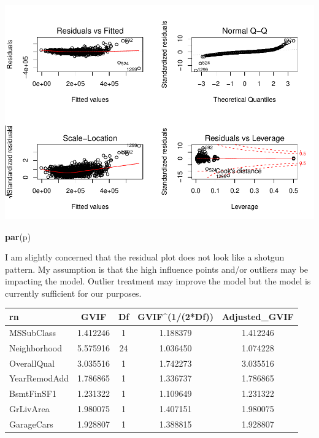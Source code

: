 \documentclass[]{article}
\newenvironment{Shaded}{\begin{snugshade}}{\end{snugshade}}
\newcommand{\KeywordTok}[1]{\textcolor[rgb]{0.13,0.29,0.53}{\textbf{{#1}}}}
\newcommand{\DataTypeTok}[1]{\textcolor[rgb]{0.13,0.29,0.53}{{#1}}}
\newcommand{\DecValTok}[1]{\textcolor[rgb]{0.00,0.00,0.81}{{#1}}}
\newcommand{\StringTok}[1]{\textcolor[rgb]{0.31,0.60,0.02}{{#1}}}
\newcommand{\OtherTok}[1]{\textcolor[rgb]{0.56,0.35,0.01}{{#1}}}
\newcommand{\NormalTok}[1]{{#1}}
\begin{document}
\includegraphics{Final_Project_files/figure-latex/unnamed-chunk-21-1.pdf}

\begin{Shaded}
\begin{Highlighting}[]
\KeywordTok{par}\NormalTok{(p)}
\end{Highlighting}
\end{Shaded}

I am slightly concerned that the residual plot does not look like a
shotgun pattern. My assumption is that the high influence points and/or
outliers may be impacting the model. Outlier treatment may improve the
model but the model is currently sufficient for our purposes.

\begin{Shaded}
\end{Shaded}

\begin{longtable}[]{@{}lcccc@{}}
\toprule
rn & GVIF & Df & GVIF\^{}(1/(2*Df)) & Adjusted\_GVIF\tabularnewline
\midrule
\endhead
MSSubClass & 1.412246 & 1 & 1.188379 & 1.412246\tabularnewline
Neighborhood & 5.575916 & 24 & 1.036450 & 1.074228\tabularnewline
OverallQual & 3.035516 & 1 & 1.742273 & 3.035516\tabularnewline
YearRemodAdd & 1.786865 & 1 & 1.336737 & 1.786865\tabularnewline
BsmtFinSF1 & 1.231322 & 1 & 1.109649 & 1.231322\tabularnewline
GrLivArea & 1.980075 & 1 & 1.407151 & 1.980075\tabularnewline
GarageCars & 1.928807 & 1 & 1.388815 & 1.928807\tabularnewline
\bottomrule
\end{longtable}
\end{document}
